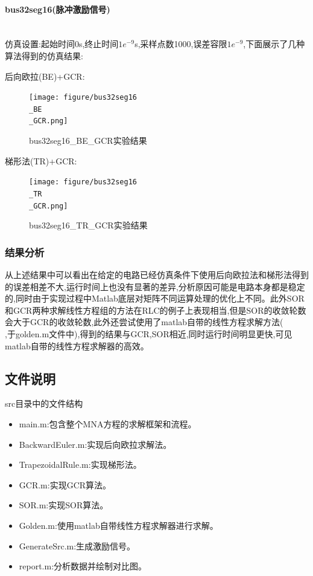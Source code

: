\documentclass[12pt]{article}
\newcommand{\subsubsubsection}[1]{\paragraph{#1}\mbox{}\\}
\begin{document}
\begin{sloppypar}
\subsubsubsection{bus32seg16(脉冲激励信号)}
\qquad 仿真设置:起始时间0s,终止时间$1e^{-9}$s,采样点数1000,误差容限$1e^{-9}$,下面展示了几种算法得到的仿真结果:

后向欧拉(BE)+GCR:

\begin{figure}[H]
  \centering
  \texttt{[image: figure/bus32seg16\\\_BE\\\_GCR.png]}
  \caption{bus32seg16\_BE\_GCR实验结果}
\end{figure}

梯形法(TR)+GCR:

\begin{figure}[H]
  \centering
  \texttt{[image: figure/bus32seg16\\\_TR\\\_GCR.png]}
  \caption{bus32seg16\_TR\_GCR实验结果}
\end{figure}

\subsubsection{结果分析}

\qquad 从上述结果中可以看出在给定的电路已经仿真条件下使用后向欧拉法和梯形法得到的误差相差不大,运行时间上也没有显著的差异,分析原因可能是电路本身都是稳定的,同时由于实现过程中Matlab底层对矩阵不同运算处理的优化上不同。此外SOR和GCR两种求解线性方程组的方法在RLC的例子上表现相当,但是SOR的收敛轮数会大于GCR的收敛轮数,此外还尝试使用了matlab自带的线性方程求解方法(\\,于golden.m文件中),得到的结果与GCR,SOR相近,同时运行时间明显更快,可见matlab自带的线性方程求解器的高效。

\subsection{文件说明}
\qquad src目录中的文件结构
\begin{itemize}
  \item main.m:包含整个MNA方程的求解框架和流程。
  \item BackwardEuler.m:实现后向欧拉求解法。
  \item TrapezoidalRule.m:实现梯形法。
  \item GCR.m:实现GCR算法。
  \item SOR.m:实现SOR算法。
  \item Golden.m:使用matlab自带线性方程求解器进行求解。
  \item GenerateSrc.m:生成激励信号。
  \item report.m:分析数据并绘制对比图。
\end{itemize}

\end{sloppypar}
\end{document}
